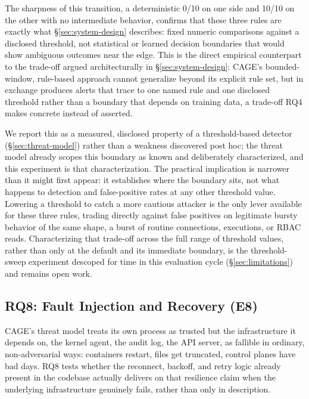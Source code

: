 \documentclass{ieeeaccess}
\begin{document}
The sharpness of this transition, a deterministic 0/10 on one side and
10/10 on the other with no intermediate behavior, confirms that these
three rules are exactly what \S\ref{sec:system-design} describes: fixed
numeric comparisons against a disclosed threshold, not statistical or
learned decision boundaries that would show ambiguous outcomes near
the edge. This is the direct empirical counterpart to the trade-off
argued architecturally in \S\ref{sec:system-design}: CAGE's
bounded-window, rule-based approach cannot generalize beyond its
explicit rule set, but in exchange produces alerts that trace to one
named rule and one disclosed threshold rather than a boundary that
depends on training data, a trade-off RQ4 makes concrete instead of
asserted.

We report this as a measured, disclosed property of a threshold-based
detector (\S\ref{sec:threat-model}) rather than a weakness discovered
post hoc; the threat model already scopes this boundary as known and
deliberately characterized, and this experiment is that
characterization. The practical implication is narrower than it might
first appear: it establishes where the boundary sits, not what happens
to detection and false-positive rates at any other threshold value.
Lowering a threshold to catch a more cautious attacker is the only
lever available for these three rules, trading directly against false
positives on legitimate bursty behavior of the same shape, a burst of
routine connections, executions, or RBAC reads. Characterizing that
trade-off across the full range of threshold values, rather than only
at the default and its immediate boundary, is the threshold-sweep
experiment descoped for time in this evaluation cycle
(\S\ref{sec:limitations}) and remains open work.

\subsection{RQ8: Fault Injection and Recovery (E8)}
\label{subsec:rq8}

CAGE's threat model treats its own process as trusted but the
infrastructure it depends on, the kernel agent, the audit log, the API
server, as fallible in ordinary, non-adversarial ways: containers
restart, files get truncated, control planes have bad days. RQ8 tests
whether the reconnect, backoff, and retry logic already present in the
codebase actually delivers on that resilience claim when the
underlying infrastructure genuinely fails, rather than only in
description.
\end{document}
